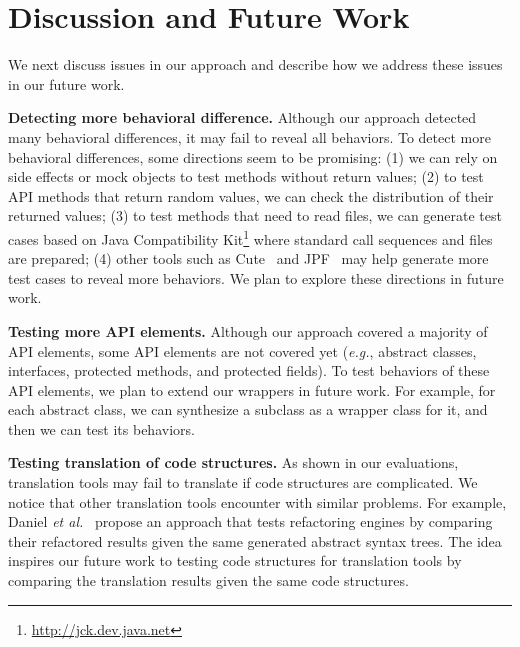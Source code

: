 

\section{Discussion and Future Work}
\label{sec:discuss}

We next discuss issues in our approach and describe how we address
these issues in our future work.

\textbf{Detecting more behavioral difference.} Although our approach detected many behavioral differences, it may fail to reveal all behaviors. To detect more behavioral differences, some directions seem to be promising: (1) we can rely on side effects or  mock objects to test methods without return values; (2) to test API methods that return random values, we can check the distribution of their returned values; (3) to test methods that need to read files, we can generate test cases based on Java Compatibility Kit\footnote{\url{http://jck.dev.java.net}} where standard call sequences and files are prepared; (4) other tools such as Cute~\cite{koushik:cute} and JPF~\cite{visser2003mcp} may help generate more test cases to reveal more behaviors. We plan to explore these directions in future work.

\textbf{Testing more API elements.} Although our approach covered a majority of API elements, some API elements are not covered yet (\emph{e.g.}, abstract classes, interfaces, protected methods, and protected fields). To test behaviors of these API elements, we plan to extend our wrappers in future work. For example, for each abstract class, we can synthesize a subclass as a wrapper class for it, and then we can test its behaviors.

\textbf{Testing translation of code structures.} As shown in our evaluations, translation tools may fail to translate if code structures are complicated. We notice that other translation tools encounter with similar problems. For example, Daniel \emph{et al.}~\cite{daniel2007automated} propose an approach that tests refactoring engines by comparing their refactored results given the same generated abstract syntax trees. The idea inspires our future work to testing code structures for translation tools by comparing the translation results given the same code structures.

